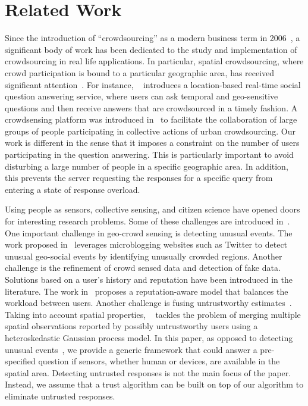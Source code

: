 \documentclass{acm_proc_article-sp}
\begin{document}
\section{Related Work}
Since the introduction of ``crowdsourcing'' as a modern business term in 2006~\cite{howe2006rise}, a significant body of work has been dedicated to the study and implementation of crowdsourcing in real life applications. In particular, spatial crowdsourcing, where crowd participation is bound to a particular geographic area, has received significant attention~\cite{kazemi2012geocrowd, deng2013maximizing, yu2015quality}. For instance, ~\cite{liu2013using} introduces a location-based real-time social question answering service, where users can ask temporal and geo-sensitive questions and then receive answers that are crowdsourced in a timely fashion. A crowdsensing platform was introduced in~\cite{cardone2013fostering} to facilitate the collaboration of large groups of people participating in collective actions of urban crowdsourcing. Our work is different in the sense that it imposes a constraint on the number of users participating in the question answering. This is particularly important to avoid disturbing a large number of people in a specific geographic area. In addition, this prevents the server requesting the responses for a specific query from entering a state of response overload.\par

Using people as sensors, collective sensing, and citizen science have opened doors for interesting research problems. Some of these challenges are introduced in~\cite{blaschke2011collective}. One important challenge in geo-crowd sensing is detecting unusual events. The work proposed in~\cite{lee2010measuring} leverages microblogging websites such as Twitter to detect unusual geo-social events by identifying unusually crowded regions. Another challenge is the refinement of crowd sensed data and detection of fake data. Solutions based on a user's history and reputation have been introduced in the literature. The work in~\cite{yu2013reputation} proposes a reputation-aware model that balances the workload between users. Another challenge is fusing untrustworthy estimates~\cite{venanzi2013trust}. Taking into account spatial properties, ~\cite{venanzi2013crowdsourcing} tackles the problem of merging multiple spatial observations reported by possibly untrustworthy users using a heteroskedastic Gaussian process model. In this paper, as opposed to detecting unusual events~\cite{blaschke2011collective}, we provide a generic framework that could answer a pre-specified question if sensors, whether human or devices, are available in the spatial area. Detecting untrusted responses is not the main focus of the paper. Instead, we assume that a trust algorithm can be built on top of our algorithm to eliminate untrusted responses.\par
\end{document}
